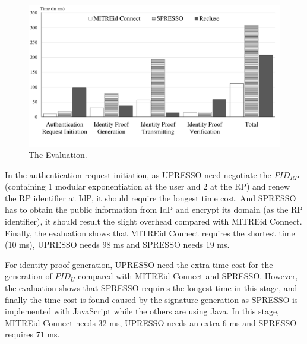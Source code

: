\begin{figure}
  \centering
  \includegraphics[width=\linewidth]{fig/evaluation2.pdf}
  \caption{The Evaluation.}
  \label{fig:evaluation}
\end{figure}
In the authentication request initiation, as UPRESSO need negotiate the $PID_{RP}$ (containing 1 modular exponentiation at the user and 2 at the RP) and renew the RP identifier at IdP, it should require the longest time cost. And SPRESSO has to obtain the public information from IdP and encrypt its domain (as the RP identifier), it should result the slight overhead compared with MITREid Connect. Finally, the evaluation shows that MITREid Connect requires the shortest time (10 ms), UPRESSO needs 98 ms and SPRESSO needs 19 ms.

For identity proof generation, UPRESSO need the extra time cost for the generation of $PID_U$ compared with MITREid Connect and SPRESSO. However, the evaluation shows that SPRESSO requires the longest time in this stage, and finally the time cost is found caused by the signature generation as SPRESSO is implemented with JavaScript while the others are using Java. In this stage, MITREid Connect needs 32 ms, UPRESSO needs an extra 6 ms and SPRESSO requires 71 ms. 


